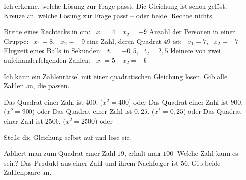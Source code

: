 \clearpage
\setcounter{aufgabe}{35}
\hypertarget{e4}{}

\begin{aufgabe}{Ich erkenne, welche Lösung zur Frage passt. Die Gleichung ist schon gelöst. Kreuze an, welche Lösung zur Frage passt – oder beide. Rechne nichts.}
\begin{teile}
\teil Breite eines Rechtecks in cm: \ $x_1 = 4$, \ $x_2 = -9$ \hfill {}
\teil Anzahl der Personen in einer Gruppe: \ $x_1 = 8$, \ $x_2 = -9$ \hfill {}
\teil eine Zahl, deren Quadrat $49$ ist: \ $x_1 = 7$, \ $x_2 = -7$ \hfill {}
\teil Flugzeit eines Balls in Sekunden: \ $t_1 = -0{,}5$, \ $t_2 = 2{,}5$ \hfill {}
\teil kleinere von zwei aufeinanderfolgenden Zahlen: \ $x_1 = 5$, \ $x_2 = -6$ \hfill {}
\end{teile}
\end{aufgabe}

\begin{aufgabe}{Ich kann ein Zahlenrätsel mit einer quadratischen Gleichung lösen. Gib alle Zahlen an, die passen.}
\begin{teile}
\teil Das Quadrat einer Zahl ist $400$. \quad ($x^2 = 400$) \hfill \leerfeld oder \leerfeld
\teil Das Quadrat einer Zahl ist $900$. \quad ($x^2 = 900$) \hfill \leerfeld oder \leerfeld
\teil Das Quadrat einer Zahl ist $0{,}25$. \quad ($x^2 = 0{,}25$) \hfill \leerfeld oder \leerfeld
\teil Das Quadrat einer Zahl ist $2500$. \quad ($x^2 = 2500$) \hfill \leerfeld oder \leerfeld
\end{teile}
\medskip
Stelle die Gleichung selbst auf und löse sie.
\begin{teile}
\teil Addiert man zum Quadrat einer Zahl $19$, erhält man $100$. Welche Zahl kann es sein?
\teil Das Produkt aus einer Zahl und ihrem Nachfolger ist $56$. Gib beide Zahlenpaare an.
\end{teile}
\end{aufgabe}


